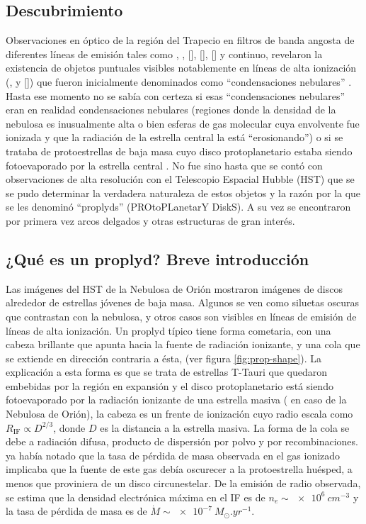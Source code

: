\subsection{Descubrimiento}
Observaciones en óptico de la región del Trapecio en filtros de banda angosta de diferentes líneas de emisión tales como , , [], [], [] y continuo, revelaron la existencia de objetos puntuales visibles notablemente en líneas de alta ionización (,  y []) que fueron inicialmente denominados como ``condensaciones nebulares'' \citep{Laques:1979}. Hasta ese momento no se sabía con certeza si esas ``condensaciones nebulares'' eran en realidad condensaciones nebulares (regiones donde la densidad de la nebulosa es inusualmente alta o bien esferas de gas molecular cuya envolvente fue ionizada y que la radiación de la estrella central la está ``erosionando'') o si se trataba de protoestrellas de baja masa cuyo disco protoplanetario estaba siendo fotoevaporado por la estrella central \citep{churchwell:1987}. No fue sino hasta que se contó con observaciones de alta resolución con el Telescopio Espacial Hubble (HST) que se se pudo determinar la verdadera naturaleza de estos objetos \citep{ODell:1993} y la razón por la que se les denominó ``proplyds'' (PROtoPLanetarY DiskS). A su vez se encontraron por primera vez arcos delgados y otras estructuras de gran interés.

\subsection{¿Qué es un proplyd? Breve introducción \citep{Johnstone:1998}}
\label{sec:prop-Johnstone}

Las imágenes del HST de la Nebulosa de Orión mostraron imágenes de discos alrededor de estrellas jóvenes de baja masa. Algunos se ven como siluetas oscuras que contrastan con la nebulosa, y otros casos son visibles en líneas de emisión de líneas de alta ionización. Un proplyd típico tiene forma cometaria, con una cabeza brillante que apunta hacia la fuente de radiación ionizante, y una cola que se extiende en dirección contraria a ésta, (ver figura \ref{fig:prop-shape}). La explicación a esta forma es que se trata de estrellas T-Tauri que quedaron embebidas por la región  en expansión y el disco protoplanetario está siendo fotoevaporado por la radiación ionizante de una estrella masiva (\thC{} en caso de la Nebulosa de Orión), la cabeza es un frente de ionización cuyo radio escala como $R_{\mathrm{IF}} \propto D^{2/3}$, donde $D$ es la distancia a la estrella masiva. La forma de la cola se debe a radiación  difusa, producto de dispersión por polvo y por recombinaciones. \citet{churchwell:1987} ya había notado que la tasa de pérdida de masa observada en el gas ionizado implicaba que la fuente de este gas debía oscurecer a la protoestrella huésped, a menos que proviniera de un disco circunestelar. De la emisión de radio observada, se estima que la densidad electrónica máxima en el IF es de $n_e \sim \SI{e6}{cm^{-3}}$ y la tasa de pérdida de masa es de $\dot{M} \sim \SI{e-7}{M_\odot.yr^{-1}}$.

